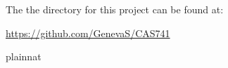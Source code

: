 \documentclass{article}
\begin{document}
The the directory for this project can be found at:
\begin{center}
	\href{https://github.com/GenevaS/CAS741}{https://github.com/GenevaS/CAS741}
\end{center}



 {plainnat}

\end{document}
